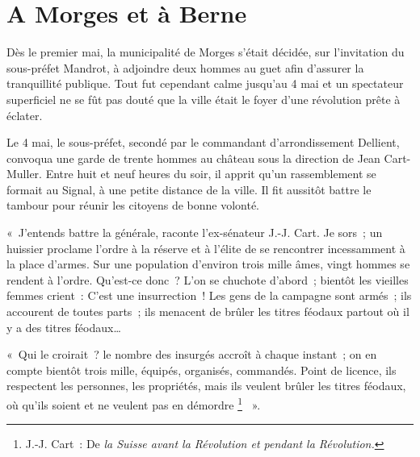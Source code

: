 \documentclass[french,twoside]{book} %
\newenvironment{quoteblock}%
  {\begin{quoting}}
  {\end{quoting}}
\newenvironment{quotebar}{%
    \def\FrameCommand{{\color{rubric!10!}\vrule width 0.5em} \hspace{0.9em}}%
    \def\OuterFrameSep{\itemsep} %
    \MakeFramed {\advance\hsize-\width \FrameRestore}
  }%
  {%
    \endMakeFramed
  }
\renewenvironment{quoteblock}%
  {%
    \savenotes
    \setstretch{0.9}
    \normalfont
    \begin{quotebar}
  }
  {%
    \end{quotebar}
    \spewnotes
  }
\begin{document}
\section[A Morges et à Berne]{A Morges et à Berne}
\noindent Dès le premier mai, la municipalité de Morges s’était décidée, sur l’invitation du sous-préfet Mandrot, à adjoindre deux hommes au guet afin d’assurer la tranquillité publique. Tout fut cependant calme jusqu’au 4 mai et un spectateur superficiel ne se fût pas douté que la ville était le foyer d’une révolution prête à éclater.\par
Le 4 mai, le sous-préfet, secondé par le commandant d’arrondissement Dellient, convoqua une garde de trente hommes au château sous la direction de Jean Cart-Muller. Entre huit et neuf heures du soir, il apprit qu’un rassemblement se formait au Signal, à une petite distance de la ville. Il fit aussitôt battre le tambour pour réunir les citoyens de bonne volonté.\par

\begin{quoteblock}
 \noindent « J’entends battre la générale, raconte l’ex-sénateur J.-J. Cart. Je sors ; un huissier proclame l’ordre à la réserve et à l’élite de se rencontrer incessamment à la place d’armes. Sur une population d’environ trois mille âmes, vingt hommes se rendent à l’ordre. Qu’est-ce donc ? L’on se chuchote d’abord ; bientôt les vieilles femmes crient : C’est une insurrection ! Les gens de la campagne sont armés ; ils accourent de toutes parts ; ils menacent de brûler les titres féodaux partout où il y a des titres féodaux…\par
 « Qui le croirait ? le nombre des insurgés accroît à chaque instant ; on en compte bientôt trois mille, équipés, organisés, commandés. Point de licence, ils respectent les personnes, les propriétés, mais ils veulent brûler les titres féodaux, où qu’ils soient et ne veulent pas en démordre \footnote{J.-J. Cart : De \emph{la Suisse avant la Révolution et pendant la Révolution.}}  ».
 \end{quoteblock}
\end{document}
